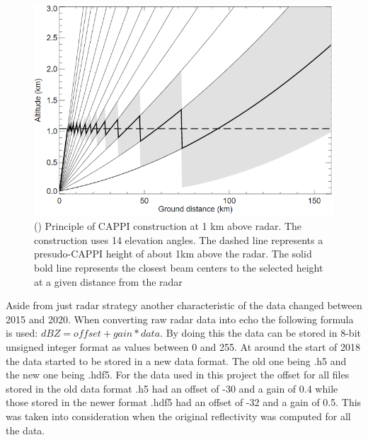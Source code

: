 \begin{figure}[H]
\centering\includegraphics[width=\textwidth]{Pictures/Diagrams/CappiPrincipleCropped.png}
\caption{(\cite{CappiDemo}) Principle of CAPPI construction at 1 km above radar. The construction uses 14 elevation angles. The dashed line represents a presudo-CAPPI height of about 1km above the radar. The solid bold line represents the closest beam centers to the selected height at a given distance from the radar}
\label{fig:CappiPrinciple}
\end{figure}

Aside from just radar strategy another characteristic of the data changed between 2015 and 2020. When converting raw radar data into echo the following formula is used:  $dBZ = offset + gain * data$. 
By doing this the data can be stored in 8-bit unsigned integer format as values between 0 and 255. At around the start of 2018 the data started to be stored in a new data format. The old one being .h5 and the new one being .hdf5. For the data used in this project the offset for all files stored in the old data format .h5 had an offset of -30 and a gain of 0.4 while those stored in the newer format .hdf5 had an offset of -32 and a gain of 0.5. This was taken into consideration when the original reflectivity was computed for all the data.  

